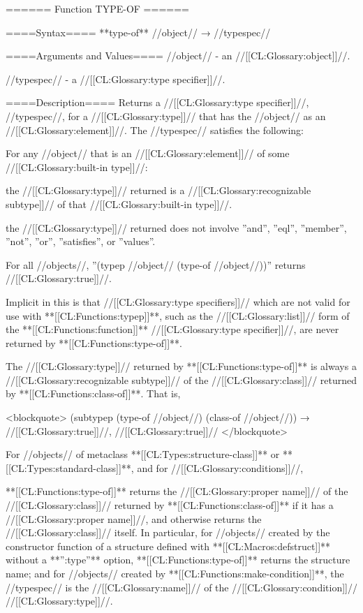 ====== Function TYPE-OF ======

====Syntax====
**type-of** //object// → //typespec//

====Arguments and Values====
//object// - an //[[CL:Glossary:object]]//.

//typespec// - a //[[CL:Glossary:type specifier]]//.

====Description====
Returns a //[[CL:Glossary:type specifier]]//, //typespec//, for a //[[CL:Glossary:type]]// that has the //object// as an //[[CL:Glossary:element]]//. The //typespec// satisfies the following:

\beginlist

 For any //object// that is an //[[CL:Glossary:element]]// of some //[[CL:Glossary:built-in type]]//:

\beginlist {} the //[[CL:Glossary:type]]// returned is a //[[CL:Glossary:recognizable subtype]]// of that //[[CL:Glossary:built-in type]]//.


the //[[CL:Glossary:type]]// returned does not involve ''and'', ''eql'', ''member'', ''not'', ''or'', ''satisfies'', or ''values''. \endlist

 For all //objects//, ''(typep //object// (type-of //object//))'' returns //[[CL:Glossary:true]]//.

Implicit in this is that //[[CL:Glossary:type specifiers]]// which are not valid for use with **[[CL:Functions:typep]]**, such as the //[[CL:Glossary:list]]// form of the **[[CL:Functions:function]]** //[[CL:Glossary:type specifier]]//, are never returned by **[[CL:Functions:type-of]]**.

 The //[[CL:Glossary:type]]// returned by **[[CL:Functions:type-of]]** is always a //[[CL:Glossary:recognizable subtype]]// of the //[[CL:Glossary:class]]// returned by **[[CL:Functions:class-of]]**. That is,

<blockquote> (subtypep (type-of //object//) (class-of //object//)) → //[[CL:Glossary:true]]//, //[[CL:Glossary:true]]// </blockquote>

 For //objects// of metaclass **[[CL:Types:structure-class]]** or **[[CL:Types:standard-class]]**, and for //[[CL:Glossary:conditions]]//,

**[[CL:Functions:type-of]]** returns the //[[CL:Glossary:proper name]]// of the //[[CL:Glossary:class]]// returned by **[[CL:Functions:class-of]]** if it has a //[[CL:Glossary:proper name]]//, and otherwise returns the //[[CL:Glossary:class]]// itself. In particular, for //objects// created by the constructor function of a structure defined with **[[CL:Macros:defstruct]]** without a **'':type''** option, **[[CL:Functions:type-of]]** returns the structure name; and for //objects// created by **[[CL:Functions:make-condition]]**, the //typespec// is the //[[CL:Glossary:name]]// of the //[[CL:Glossary:condition]]// //[[CL:Glossary:type]]//.


